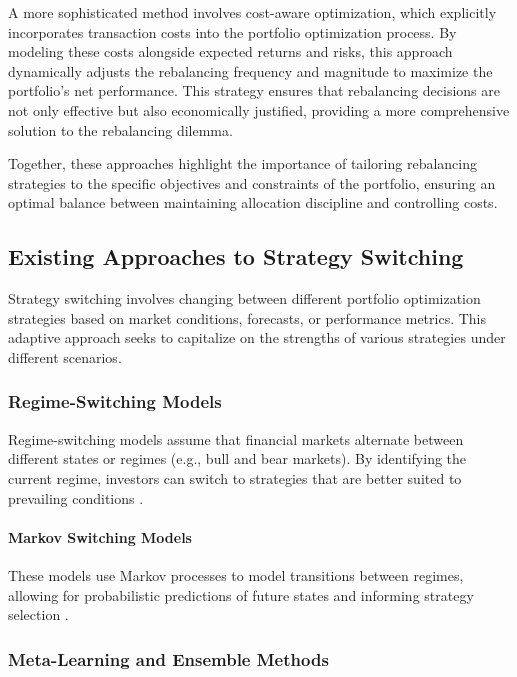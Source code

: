 A more sophisticated method involves cost-aware optimization, which explicitly incorporates transaction costs into the portfolio optimization process. By modeling these costs alongside expected returns and risks, this approach dynamically adjusts the rebalancing frequency and magnitude to maximize the portfolio’s net performance. This strategy ensures that rebalancing decisions are not only effective but also economically justified, providing a more comprehensive solution to the rebalancing dilemma.

Together, these approaches highlight the importance of tailoring rebalancing strategies to the specific objectives and constraints of the portfolio, ensuring an optimal balance between maintaining allocation discipline and controlling costs.

\subsection{Existing Approaches to Strategy Switching}

Strategy switching involves changing between different portfolio optimization strategies based on market conditions, forecasts, or performance metrics. This adaptive approach seeks to capitalize on the strengths of various strategies under different scenarios.

\subsubsection{Regime-Switching Models}

Regime-switching models assume that financial markets alternate between different states or regimes (e.g., bull and bear markets). By identifying the current regime, investors can switch to strategies that are better suited to prevailing conditions \cite{ang2002regime}.

\paragraph{Markov Switching Models}

These models use Markov processes to model transitions between regimes, allowing for probabilistic predictions of future states and informing strategy selection \cite{hamilton1989new}.

\subsubsection{Meta-Learning and Ensemble Methods}

